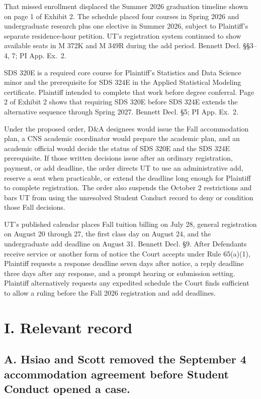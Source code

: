 \documentclass[12pt]{article}
\newcommand{\PIEx}[1]{PI App. Ex.~#1}
\begin{document}
That missed enrollment displaced the Summer 2026 graduation timeline shown on page 1 of Exhibit 2. The schedule placed four courses in Spring 2026 and undergraduate research plus one elective in Summer 2026, subject to Plaintiff's separate residence-hour petition. UT's registration system continued to show available seats in M 372K and M 349R during the add period. Bennett Decl. \S\S 3--4, 7; \PIEx{2}.
 
SDS 320E is a required core course for Plaintiff's Statistics and Data Science minor and the prerequisite for SDS 324E in the Applied Statistical Modeling certificate. Plaintiff intended to complete that work before degree conferral. Page 2 of Exhibit 2 shows that requiring SDS 320E before SDS 324E extends the alternative sequence through Spring 2027. Bennett Decl. \S 5; \PIEx{2}.
 
Under the proposed order, D\&A designees would issue the Fall accommodation plan, a CNS academic coordinator would prepare the academic plan, and an academic official would decide the status of SDS 320E and the SDS 324E prerequisite. If those written decisions issue after an ordinary registration, payment, or add deadline, the order directs UT to use an administrative add, reserve a seat when practicable, or extend the deadline long enough for Plaintiff to complete registration. The order also suspends the October 2 restrictions and bars UT from using the unresolved Student Conduct record to deny or condition those Fall decisions.
 
UT's published calendar places Fall tuition billing on July 28, general registration on August 20 through 27, the first class day on August 24, and the undergraduate add deadline on August 31. Bennett Decl. \S 9. After Defendants receive service or another form of notice the Court accepts under Rule 65(a)(1), Plaintiff requests a response deadline seven days after notice, a reply deadline three days after any response, and a prompt hearing or submission setting. Plaintiff alternatively requests any expedited schedule the Court finds sufficient to allow a ruling before the Fall 2026 registration and add deadlines.
 
\section*{I. Relevant record}
 
\subsection*{A. Hsiao and Scott removed the September 4 accommodation agreement before Student Conduct opened a case.}
 
\end{document}

